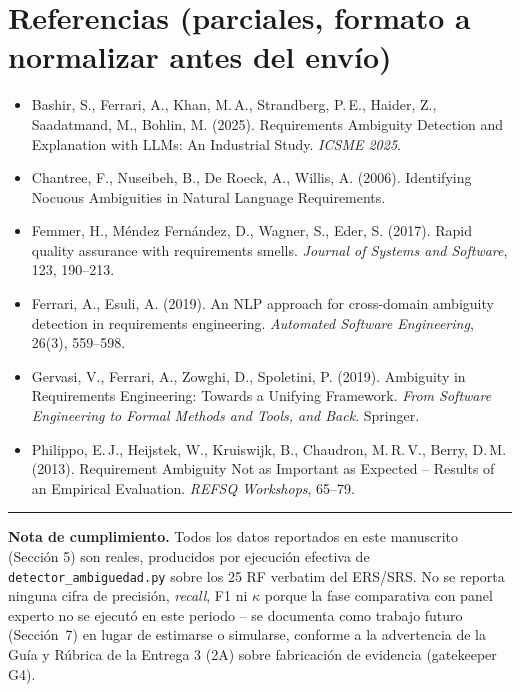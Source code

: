 \documentclass[11pt,a4paper]{article}
\begin{document}
\section*{Referencias (parciales, formato a normalizar antes del env\'io)}
{\small
\begin{itemize}[leftmargin=*]
\item Bashir, S., Ferrari, A., Khan, M.\,A., Strandberg, P.\,E., Haider, Z., Saadatmand, M., Bohlin, M. (2025). Requirements Ambiguity Detection and Explanation with LLMs: An Industrial Study. \emph{ICSME 2025}.
\item Chantree, F., Nuseibeh, B., De Roeck, A., Willis, A. (2006). Identifying Nocuous Ambiguities in Natural Language Requirements.
\item Femmer, H., M\'endez Fern\'andez, D., Wagner, S., Eder, S. (2017). Rapid quality assurance with requirements smells. \emph{Journal of Systems and Software}, 123, 190--213.
\item Ferrari, A., Esuli, A. (2019). An NLP approach for cross-domain ambiguity detection in requirements engineering. \emph{Automated Software Engineering}, 26(3), 559--598.
\item Gervasi, V., Ferrari, A., Zowghi, D., Spoletini, P. (2019). Ambiguity in Requirements Engineering: Towards a Unifying Framework. \emph{From Software Engineering to Formal Methods and Tools, and Back}. Springer.
\item Philippo, E.\,J., Heijstek, W., Kruiswijk, B., Chaudron, M.\,R.\,V., Berry, D.\,M. (2013). Requirement Ambiguity Not as Important as Expected -- Results of an Empirical Evaluation. \emph{REFSQ Workshops}, 65--79.
\end{itemize}
}

\vspace{0.8cm}
\noindent\rule{\linewidth}{0.4pt}
\small
\textbf{Nota de cumplimiento.} Todos los datos reportados en este manuscrito (Secci\'on 5) son reales, producidos por ejecuci\'on efectiva de \texttt{detector\_ambiguedad.py} sobre los 25 RF verbatim del ERS/SRS. No se reporta ninguna cifra de precisi\'on, \emph{recall}, F1 ni $\kappa$ porque la fase comparativa con panel experto no se ejecut\'o en este periodo -- se documenta como trabajo futuro (Secci\'on~7) en lugar de estimarse o simularse, conforme a la advertencia de la Gu\'ia y R\'ubrica de la Entrega 3 (2A) sobre fabricaci\'on de evidencia (gatekeeper G4).
\end{document}
